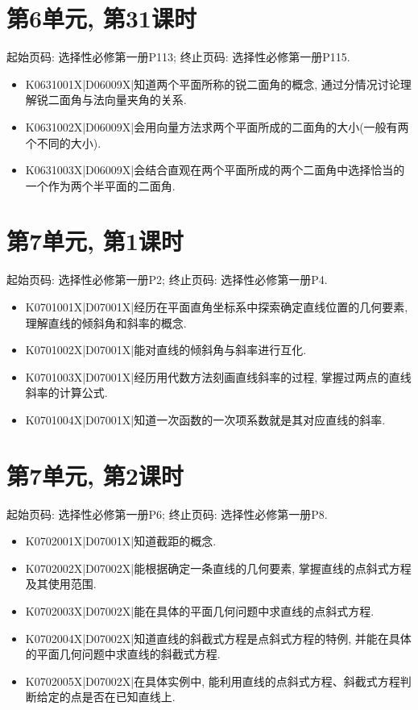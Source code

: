 \section*{第6单元, 第31课时}
起始页码: 选择性必修第一册P113; 终止页码: 选择性必修第一册P115.
\begin{itemize}
\item K0631001X|D06009X|知道两个平面所称的锐二面角的概念, 通过分情况讨论理解锐二面角与法向量夹角的关系.
\item K0631002X|D06009X|会用向量方法求两个平面所成的二面角的大小(一般有两个不同的大小).
\item K0631003X|D06009X|会结合直观在两个平面所成的两个二面角中选择恰当的一个作为两个半平面的二面角.
\end{itemize}

\section*{第7单元, 第1课时}
起始页码: 选择性必修第一册P2; 终止页码: 选择性必修第一册P4.
\begin{itemize}
\item K0701001X|D07001X|经历在平面直角坐标系中探索确定直线位置的几何要素, 理解直线的倾斜角和斜率的概念.
\item K0701002X|D07001X|能对直线的倾斜角与斜率进行互化.
\item K0701003X|D07001X|经历用代数方法刻画直线斜率的过程, 掌握过两点的直线斜率的计算公式.
\item K0701004X|D07001X|知道一次函数的一次项系数就是其对应直线的斜率.
\end{itemize}

\section*{第7单元, 第2课时}
起始页码: 选择性必修第一册P6; 终止页码: 选择性必修第一册P8.
\begin{itemize}
\item K0702001X|D07001X|知道截距的概念.
\item K0702002X|D07002X|能根据确定一条直线的几何要素, 掌握直线的点斜式方程及其使用范围.
\item K0702003X|D07002X|能在具体的平面几何问题中求直线的点斜式方程.
\item K0702004X|D07002X|知道直线的斜截式方程是点斜式方程的特例, 并能在具体的平面几何问题中求直线的斜截式方程.
\item K0702005X|D07002X|在具体实例中, 能利用直线的点斜式方程、斜截式方程判断给定的点是否在已知直线上.
\end{itemize}

